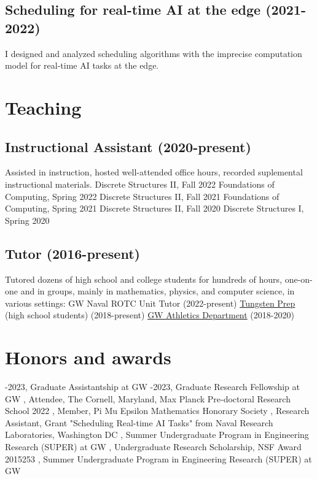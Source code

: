 \documentclass[letterpaper]{article}
\begin{document}
\subsection*{Scheduling for real-time AI at the edge (2021-2022)}
I designed and analyzed scheduling algorithms with the imprecise computation model for real-time AI tasks at the edge. 

\section*{Teaching}
\subsection*{Instructional Assistant (2020-present)}
Assisted in instruction, hosted well-attended office hours, recorded suplemental instructional materials.
\subsubitem
Discrete Structures II, Fall 2022
\subsubitem
Foundations of Computing, Spring 2022
\subsubitem
Discrete Structures II, Fall 2021
\subsubitem
Foundations of Computing, Spring 2021
\subsubitem
Discrete Structures II, Fall 2020
\subsubitem
Discrete Structures I, Spring 2020

\subsection*{Tutor (2016-present)}
Tutored dozens of high school and college students for hundreds of hours, one-on-one and in groups, mainly in mathematics, physics, and computer science, in various settings:
\subitem 
GW Naval ROTC Unit Tutor (2022-present)
\subitem
\href{https://www.tungstenprep.com/}{Tungsten Prep} (high school students) (2018-present) 
\subitem
\href{https://gwsports.com/sports/2018/7/23/school-bio-academic-support-tutor-info-html.aspx}{GW Athletics Department} (2018-2020) 

\section*{Honors and awards}

-2023, Graduate Assistantship at GW
-2023, Graduate Research Fellowship at GW
, Attendee, The Cornell, Maryland, Max Planck Pre-doctoral Research School 2022
, Member, Pi Mu Epsilon Mathematics Honorary Society
, Research Assistant, Grant "Scheduling Real-time AI Tasks" from Naval Research Laboratories, Washington DC
, Summer Undergraduate Program in Engineering Research (SUPER) at GW
, Undergraduate Research Scholarship, NSF Award 2015253
, Summer Undergraduate Program in Engineering Research (SUPER) at GW
\end{document}
